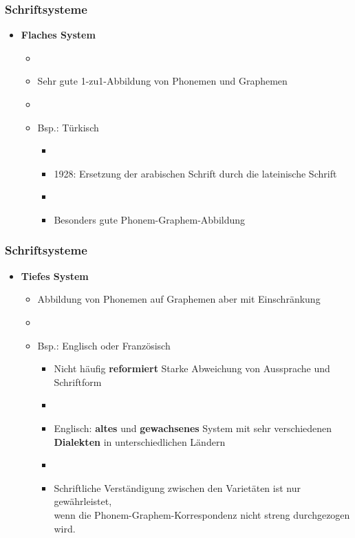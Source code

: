 \begin{frame}
\frametitle{Schriftsysteme}

\begin{itemize}
	\item \textbf{Flaches System}
	
	\begin{itemize}
		\item[]
		\item Sehr gute 1-zu1-Abbildung von Phonemen und Graphemen
		\item[]
		\item Bsp.: Türkisch
		
		\begin{itemize}
			\item[]
			\item 1928: Ersetzung der arabischen Schrift durch die lateinische Schrift
			\item[]
			\item Besonders gute Phonem-Graphem-Abbildung
		\end{itemize}
	\end{itemize}
\end{itemize}
\end{frame}



\begin{frame}
\frametitle{Schriftsysteme}

\begin{itemize}
	\item \textbf{Tiefes System}
	
	\begin{itemize}
		\item Abbildung von Phonemen auf Graphemen aber mit Einschränkung
		\item[]
		\item Bsp.: Englisch oder Französisch
		
		\begin{itemize}
			\item Nicht häufig \textbf{reformiert} \ras Starke Abweichung von Aussprache und Schriftform
			\item[]			
			\item Englisch: \textbf{altes} und \textbf{gewachsenes} System mit sehr verschiedenen \textbf{Dialekten} in unterschiedlichen Ländern
			\item[]
			\item Schriftliche Verständigung zwischen den Varietäten ist nur gewährleistet,\\
                          wenn die Phonem-Graphem-Korrespondenz nicht streng durchgezogen wird.
		\end{itemize}
	\end{itemize}
\end{itemize}


\end{frame}



